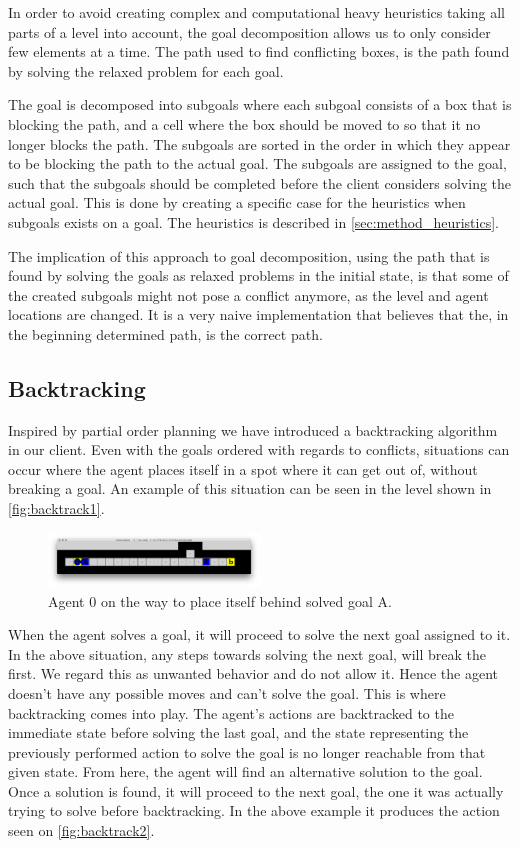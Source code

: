 \documentclass[Main]{subfiles}
\begin{document}
In order to avoid creating complex and computational heavy heuristics taking all
parts of a level into account, the goal decomposition allows us to only consider
few elements at a time. 
The path used to find conflicting boxes, is the path found by solving the
relaxed problem for each goal.

The goal is decomposed into subgoals where each subgoal consists of a box that
is blocking the path, and a cell where the box should be moved to so that it no
longer blocks the path. The subgoals are sorted in the order in which they
appear to be blocking the path to the actual goal. The subgoals are assigned to
the goal, such that the subgoals should be completed before the client considers
solving the actual goal. This is done by creating a specific case for the
heuristics when subgoals exists on a goal. The heuristics is described in
\autoref{sec:method_heuristics}. 

The implication of this approach to goal decomposition, using the path that is
found by solving the goals as relaxed problems in the initial state, is that
some of the created subgoals might not pose a conflict anymore, as the level and
agent locations are changed. It is a very naive implementation that believes
that the, in the beginning determined path, is the correct path. 

\subsection{Backtracking}
Inspired by partial order planning we have introduced a backtracking algorithm
in our client. Even with the goals ordered with regards to conflicts, situations
can occur where the agent places itself in a spot where it can get out of,
without breaking a goal. An example of this situation can be seen in the level
shown in \autoref{fig:backtrack1}.
\begin{figure}[h!]
  \centering
  \includegraphics[width=0.5\textwidth]{backtrack1.png}
  \caption{Agent 0 on the way to place itself behind solved goal A.}
  \label{fig:backtrack1}
\end{figure}

When the agent solves a goal, it will proceed to solve the next goal assigned to
it. 
In the above situation, any steps towards solving the next goal, will break the
first. 
We regard this as unwanted behavior and do not allow it. 
Hence the agent doesn't have any possible moves and can't solve the goal. 
This is where backtracking comes into play. 
The agent's actions are backtracked to the immediate state before solving the
last goal, and the state representing the previously performed action to solve
the goal is no longer reachable from that given state. 
From here, the agent will find an alternative solution to the goal. 
Once a solution is found, it will proceed to the next goal, the one it was
actually trying to solve before backtracking. 
In the above example it produces the action seen on \autoref{fig:backtrack2}.
\end{document}
